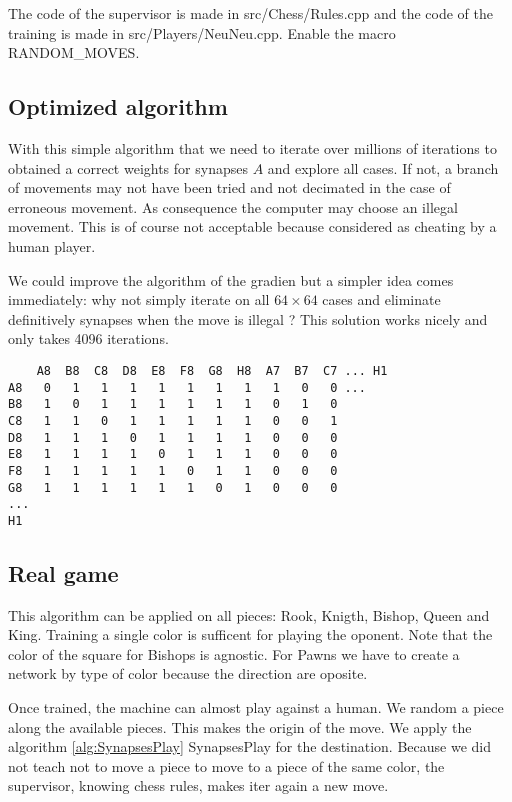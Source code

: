 \documentclass[a4paper,10pt]{article}
\begin{document}
The code of the supervisor is made in src/Chess/Rules.cpp and the code of the
training is made in src/Players/NeuNeu.cpp. Enable the macro RANDOM\_MOVES.

\subsection*{Optimized algorithm}

With this simple algorithm that we need to iterate over millions of iterations
to obtained a correct weights for synapses $A$ and explore all cases. If not, a
branch of movements may not have been tried and not decimated in the case of
erroneous movement. As consequence the computer may choose an illegal
movement. This is of course not acceptable because considered as cheating by a
human player.

We could improve the algorithm of the gradien but a simpler idea comes
immediately: why not simply iterate on all $64 \times 64$ cases and eliminate
definitively synapses when the move is illegal ? This solution works nicely and
only takes 4096 iterations.

\begin{verbatim}
    A8  B8  C8  D8  E8  F8  G8  H8  A7  B7  C7 ... H1
A8   0   1   1   1   1   1   1   1   1   0   0 ...
B8   1   0   1   1   1   1   1   1   0   1   0
C8   1   1   0   1   1   1   1   1   0   0   1
D8   1   1   1   0   1   1   1   1   0   0   0
E8   1   1   1   1   0   1   1   1   0   0   0
F8   1   1   1   1   1   0   1   1   0   0   0
G8   1   1   1   1   1   1   0   1   0   0   0
...
H1
\end{verbatim}

\subsection*{Real game}

This algorithm can be applied on all pieces: Rook, Knigth, Bishop, Queen and
King. Training a single color is sufficent for playing the oponent. Note that
the color of the square for Bishops is agnostic. For Pawns we have to create a
network by type of color because the direction are oposite.

Once trained, the machine can almost play against a human. We random a piece
along the available pieces. This makes the origin of the move. We apply the
algorithm \ref{alg:SynapsesPlay} SynapsesPlay for the destination. Because we
did not teach not to move a piece to move to a piece of the same color, the
supervisor, knowing chess rules, makes iter again a new move.
\end{document}
